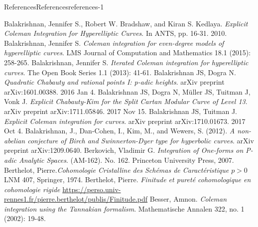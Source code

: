 \documentclass[oneside,10pt,]{book}
\numberwithin{equation}{section}
\newcommand{\gt}{>}
\begin{document}
\begin{references-chapter-numberless}{References}{}{References}{}{}{references-1}
\begin{thebibliography}{9}
\hypertarget{bib-balakrishnan-bradshaw-kedlaya}{}Balakrishnan, Jennifer S., Robert W. Bradshaw, and Kiran S. Kedlaya. \textit{Explicit Coleman Integration for Hyperelliptic Curves}. In ANTS, pp. 16-31. 2010.
\hypertarget{bib-balakrishnan-even}{}Balakrishnan, Jennifer S. \textit{Coleman integration for even-degree models of hyperelliptic curves}. LMS Journal of Computation and Mathematics 18.1 (2015): 258-265.
\hypertarget{bib-balakrishnan-iterated}{}Balakrishnan, Jennifer S. \textit{Iterated Coleman integration for hyperelliptic curves}. The Open Book Series 1.1 (2013): 41-61.
\hypertarget{bib-balakrishnan-dogra}{}Balakrishnan JS, Dogra N. \textit{Quadratic Chabauty and rational points I: p-adic heights}. arXiv preprint arXiv:1601.00388. 2016 Jan 4.
\hypertarget{bib-balakrishnan-dogra-muller-tuitman-vonk}{}Balakrishnan JS, Dogra N, Müller JS, Tuitman J, Vonk J. \textit{Explicit Chabauty-Kim for the Split Cartan Modular Curve of Level 13}. arXiv preprint arXiv:1711.05846. 2017 Nov 15.
\hypertarget{bib-balakrishnan-tuitman}{}Balakrishnan JS, Tuitman J. \textit{Explicit Coleman integration for curves}. arXiv preprint arXiv:1710.01673. 2017 Oct 4.
\hypertarget{bib-bala-nonab}{}Balakrishnan, J., Dan-Cohen, I., Kim, M., and Wewers, S. (2012). \textit{A non-abelian conjecture of Birch and Swinnerton-Dyer type for hyperbolic curves}. arXiv preprint arXiv:1209.0640.
\hypertarget{bib-berkovich}{}Berkovich, Vladimir G.  \textit{Integration of One-forms on P-adic Analytic Spaces}. (AM-162). No. 162. Princeton University Press, 2007.
\hypertarget{bib-berth1}{}Berthelot, Pierre.\textit{Cohomologie Cristalline des Schémas de Caractéristique \(p\gt 0\)} LNM 407, Springer, 1974.
\hypertarget{bib-berth2}{}Berthelot, Pierre.  \textit{Finitude et pureté cohomologique en cohomologie rigide} \url{https://perso.univ-rennes1.fr/pierre.berthelot/publis/Finitude.pdf}
\hypertarget{bib-besser-coleman-tannakian}{}Besser, Amnon. \textit{Coleman integration using the Tannakian formalism}. Mathematische Annalen 322, no. 1 (2002): 19-48.

\end{thebibliography}
\end{references-chapter-numberless}
\end{document}
